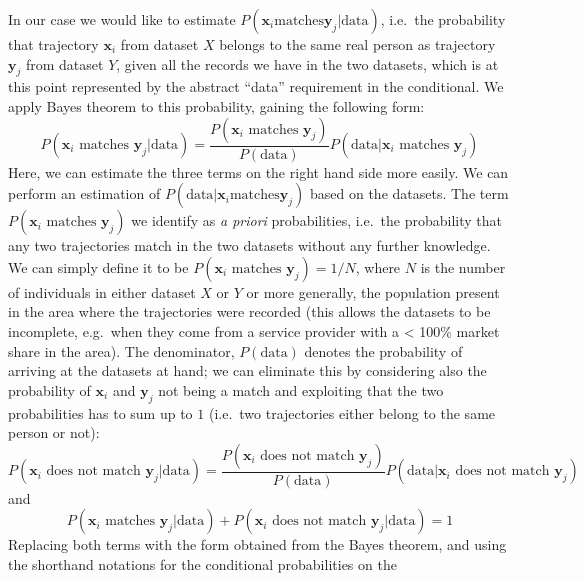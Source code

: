 \documentclass[a4paper]{article}
\renewcommand{\vec}[1]{\mathbf{#1}}
\begin{document}
		In our case we would like to estimate $P( \vec{x}_i \textrm{matches} \vec{y}_j | \textrm{data} )$, i.e.~the probability that trajectory
		$\vec{x}_i$ from dataset $X$ belongs to the same real person as trajectory $\vec{y}_j$ from dataset $Y$, given all the records we have in the
		two datasets, which is at this point represented by the abstract ``data'' requirement in the conditional. We apply Bayes theorem to this
		probability, gaining the following form:
		\begin{equation}
			P( \vec{x}_i \textrm{ matches } \vec{y}_j | \textrm{data} ) = \frac{ P( \vec{x}_i \textrm{ matches } \vec{y}_j ) }{ P( \textrm{data} ) }
				P( \textrm{data} | \vec{x}_i \textrm{ matches } \vec{y}_j )
		\end{equation}
		Here, we can estimate the three terms on the right hand side more easily. We can perform an estimation of $P( \textrm{data} | \vec{x}_i %
		\textrm{matches} \vec{y}_j )$ based on the datasets. The term $P( \vec{x}_i \textrm{ matches } \vec{y}_j )$ we identify as \emph{a priori}
		probabilities, i.e.~the probability that any two trajectories match in the two datasets without any further knowledge. We can simply define
		it to be $P( \vec{x}_i \textrm{ matches } \vec{y}_j ) = 1/N$, where $N$ is the number of individuals in either dataset $X$ or $Y$ or more
		generally, the population present in the area where the trajectories were recorded (this allows the datasets to be incomplete, e.g.~when
		they come from a service provider with a < 100\% market share in the area). The denominator, $P( \textrm{data} )$ denotes the probability of
		arriving at the datasets at hand; we can eliminate this by considering also the probability of $\vec{x}_i$ and $\vec{y}_j$ not being a match
		and exploiting that the two probabilities has to sum up to $1$ (i.e.~two trajectories either belong to the same person or not):
		\begin{equation}
			P( \vec{x}_i \textrm{ does not match } \vec{y}_j | \textrm{data} ) = \frac{ P( \vec{x}_i \textrm{ does not match } \vec{y}_j ) }{ P( \textrm{data} ) }
				P( \textrm{data} | \vec{x}_i \textrm{ does not match } \vec{y}_j )
		\end{equation}
		and
		\begin{equation}
			P( \vec{x}_i \textrm{ matches } \vec{y}_j | \textrm{data} ) + P( \vec{x}_i \textrm{ does not match } \vec{y}_j | \textrm{data} ) = 1
		\end{equation}
		Replacing both terms with the form obtained from the Bayes theorem, and using the shorthand notations for the conditional probabilities on the
\end{document}
